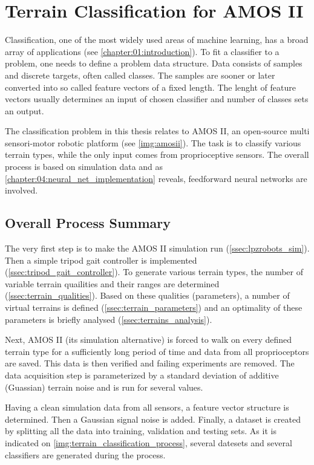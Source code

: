 \chapter{Terrain Classification for AMOS II} \label{chapter:05:terrain_classification}
Classification, one of the most widely used areas of machine learning, has a broad array of applications (see \cref{chapter:01:introduction}). To fit a classifier to a problem, one needs to define a problem data structure. Data consists of samples and discrete targets, often called classes. The samples are sooner or later converted into so called feature vectors of a fixed length. The lenght of feature vectors usually determines an input of chosen classifier and number of classes sets an output.

The classification problem in this thesis relates to AMOS II, an open-source multi sensori-motor robotic platform (see \cref{img:amosii}). The task is to classify various terrain types, while the only input comes from proprioceptive sensors. The overall process is based on simulation data and as \cref{chapter:04:neural_net_implementation} reveals, feedforward neural networks are involved.

\section{Overall Process Summary}
The very first step is to make the AMOS II simulation run (\cref{ssec:lpzrobots_sim}). Then a simple tripod gait controller is implemented (\cref{ssec:tripod_gait_controller}). To generate various terrain types, the number of variable terrain quailities and their ranges are determined (\cref{ssec:terrain_qualities}). Based on these qualities (parameters), a number of virtual terrains is defined (\cref{ssec:terrain_parameters}) and an optimality of these parameters is briefly analysed (\cref{ssec:terrains_analysis}).

Next, AMOS II (its simulation alternative) is forced to walk on every defined terrain type for a sufficiently long period of time and data from all proprioceptors are saved. This data is then verified and failing experiments are removed. The data acquisition step is parameterized by a standard deviation of additive (Guassian) terrain noise and is run for several values.

Having a clean simulation data from all sensors, a feature vector structure is determined. Then a Gaussian signal noise is added. Finally, a dataset is created by splitting all the data into training, validation and testing sets. As it is indicated on \cref{img:terrain_classification_process}, several datesets and several classifiers are generated during the process. 

